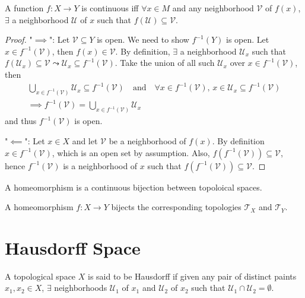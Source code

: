 \begin{prop}
    A function $f: X\to Y$ is continuous iff $\forall x\in M$ and any neighborhood $\mathcal V$ of $f(x)$, $\exists$ a neighborhood $\mathcal U$ of $x$ such that $f(\mathcal U) \subseteq \mathcal V$.
    \begin{proof}
        "$\implies$": Let $\mathcal V\subseteq Y$ is open. We need to show $f^{-1}(Y)$ is open. Let $x\in f^{-1}(\mathcal V)$, then $f(x) \in \mathcal V$. By definition, $\exists$ a neighborhood $\mathcal U_x$ such that $f(\mathcal U_x) \subseteq \mathcal V \leadsto \mathcal U_x \subseteq f^{-1}(\mathcal V)$. Take the union of all such $\mathcal U_x$ over $x\in f^{-1}(\mathcal V)$, then
        \begin{gather*}
            \bigcup_{x\in f^{-1}(\mathcal V)} \mathcal U_x \subseteq f^{-1}(\mathcal V) \quad\text{and}\quad \forall x \in f^{-1}(\mathcal V),\, x\in \mathcal U_x \subseteq f^{-1}(\mathcal V) \\
            \implies f^{-1}(\mathcal V) = \bigcup_{x\in f^{-1}(\mathcal V)} \mathcal U_x
        \end{gather*}
        and thus $f^{-1}(\mathcal V)$ is open.

        "$\impliedby$": Let $x\in X$ and let $\mathcal V$ be a neighborhood of $f(x)$. By definition $x\in f^{-1}(\mathcal V)$, which is an open set by assumption. Also, $f(f^{-1}(\mathcal V)) \subseteq \mathcal V$, hence $f^{-1}(\mathcal V)$ is a neighborhood of $x$ such that $f(f^{-1}(\mathcal V)) \subseteq \mathcal V$.
    \end{proof}
\end{prop}

\begin{df}
    A homeomorphism is a continuous bijection between topoloical spaces.
\end{df}

\begin{cl}
    A homeomorphism $f: X \to Y$ bijects the corresponding topologies $\mathcal T_X$ and $\mathcal T_Y$.
\end{cl}

\section{Hausdorff Space}

\begin{df}
    A topological space $X$ is said to be Hausdorff if given any pair of distinct paints $x_1, x_2 \in X$, $\exists$ neighborhoods $\mathcal U_1$ of $x_1$ and $\mathcal U_2$ of $x_2$ such that $\mathcal U_1 \cap \mathcal U_2 = \emptyset$.
\end{df}

